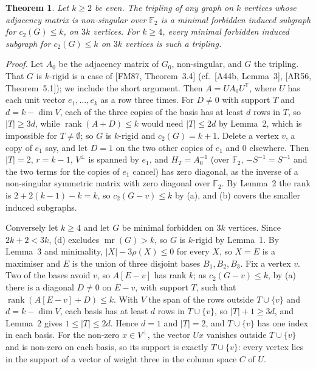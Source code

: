 \documentclass[11pt,letterpaper,reqno]{amsart}
\theoremstyle{spaced}
\newtheorem{theorem}{Theorem}
\begin{document}
\begin{theorem}
Let \(k \ge 2\) be even. The tripling of any graph on \(k\) vertices whose adjacency matrix is non-singular over \(\mathbb{F}_2\) is a minimal forbidden induced subgraph for \(c_2(G) \le k\), on \(3k\) vertices. For \(k \ge 4\), every minimal forbidden induced subgraph for \(c_2(G) \le k\) on \(3k\) vertices is such a tripling.
\end{theorem}

\emph{Proof.} Let \(A_0\) be the adjacency matrix of \(G_0\), non-singular, and \(G\) the tripling. That \(G\) is \(k\)-rigid is a case of {[}FM87, Theorem~3.4{]} (cf.~{[}A44b, Lemma~3{]}, {[}AR56, Theorem~5.1{]}); we include the short argument. Then \(A = U A_0 U^{\mathsf T}\), where \(U\) has each unit vector \(e_1, \dots, e_k\) as a row three times. For \(D \ne 0\) with support \(T\) and \(d = k - \dim V\), each of the three copies of the basis has at least \(d\) rows in \(T\), so \(\lvert T\rvert \ge 3d\), while \(\operatorname{rank}(A + D) \le k\) would need \(\lvert T\rvert \le 2d\) by Lemma~2, which is impossible for \(T \ne \emptyset\); so \(G\) is \(k\)-rigid and \(c_2(G) = k+1\). Delete a vertex \(v\), a copy of \(e_1\) say, and let \(D = 1\) on the two other copies of \(e_1\) and \(0\) elsewhere. Then \(\lvert T\rvert = 2\), \(r = k-1\), \(V^{\perp}\) is spanned by \(e_1\), and \(H_T = A_0^{-1}\) (over \(\mathbb{F}_2\), \(-S^{-1} = S^{-1}\) and the two terms for the copies of \(e_1\) cancel) has zero diagonal, as the inverse of a non-singular symmetric matrix with zero diagonal over \(\mathbb{F}_2\). By Lemma~2 the rank is \(2 + 2(k-1) - k = k\), so \(c_2(G - v) \le k\) by (a), and (b) covers the smaller induced subgraphs.

Conversely let \(k \ge 4\) and let \(G\) be minimal forbidden on \(3k\) vertices. Since \(2k+2 < 3k\), (d) excludes \(\operatorname{mr}(G) > k\), so \(G\) is \(k\)-rigid by Lemma~1. By Lemma~3 and minimality, \(\lvert X\rvert - 3\rho(X) \le 0\) for every \(X\), so \(X = E\) is a maximiser and \(E\) is the union of three disjoint bases \(B_1, B_2, B_3\). Fix a vertex \(v\). Two of the bases avoid \(v\), so \(A[E - v]\) has rank \(k\); as \(c_2(G - v) \le k\), by (a) there is a diagonal \(D \ne 0\) on \(E - v\), with support \(T\), such that \(\operatorname{rank}(A[E - v] + D) \le k\). With \(V\) the span of the rows outside \(T \cup \{v\}\) and \(d = k - \dim V\), each basis has at least \(d\) rows in \(T \cup \{v\}\), so \(\lvert T\rvert + 1 \ge 3d\), and Lemma~2 gives \(1 \le \lvert T\rvert \le 2d\). Hence \(d = 1\) and \(\lvert T\rvert = 2\), and \(T \cup \{v\}\) has one index in each basis. For the non-zero \(x \in V^{\perp}\), the vector \(Ux\) vanishes outside \(T \cup \{v\}\) and is non-zero on each basis, so its support is exactly \(T \cup \{v\}\): every vertex lies in the support of a vector of weight three in the column space \(C\) of \(U\).
\end{document}
